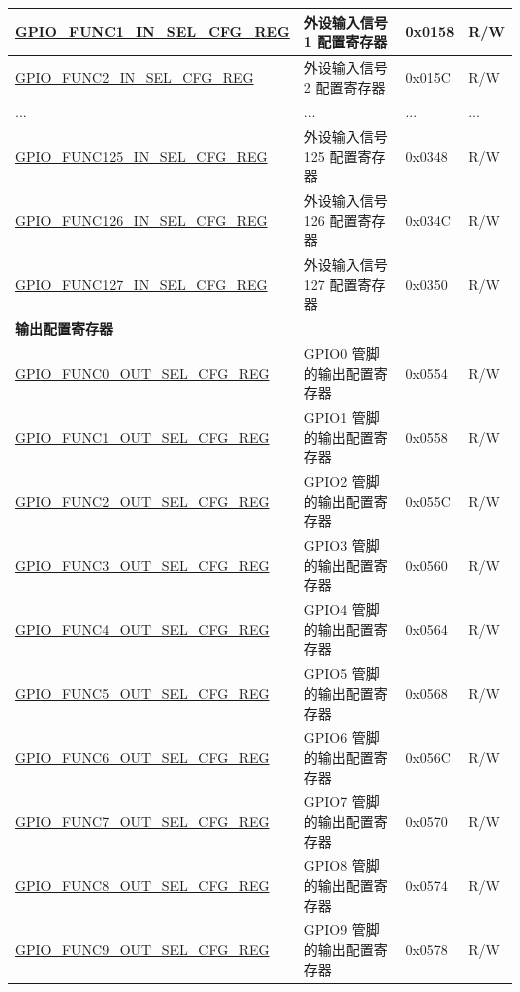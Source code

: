 \begin{longtable}{ | p{6cm} | p{6.7cm} | p{1.3cm} | p{1.5cm} | }
\hyperref[regdesc:GPIOFUNCNINSELCFGREG]{GPIO\_FUNC1\_IN\_SEL\_CFG\_REG} & 外设输入信号 1 配置寄存器 & 0x0158 & R/W \\ \hline
\hyperref[regdesc:GPIOFUNCNINSELCFGREG]{GPIO\_FUNC2\_IN\_SEL\_CFG\_REG} & 外设输入信号 2 配置寄存器 & 0x015C & R/W \\ \hline
... & ... & ... & ... \\ \hline
\hyperref[regdesc:GPIOFUNCNINSELCFGREG]{GPIO\_FUNC125\_IN\_SEL\_CFG\_REG} & 外设输入信号 125 配置寄存器 & 0x0348 & R/W \\ \hline
\hyperref[regdesc:GPIOFUNCNINSELCFGREG]{GPIO\_FUNC126\_IN\_SEL\_CFG\_REG} & 外设输入信号 126 配置寄存器 & 0x034C & R/W \\ \hline
\hyperref[regdesc:GPIOFUNCNINSELCFGREG]{GPIO\_FUNC127\_IN\_SEL\_CFG\_REG} & 外设输入信号 127 配置寄存器 & 0x0350 & R/W \\ \hline
\multicolumn{4}{|l|}{\textbf{输出配置寄存器}} \\ \hline
\hyperref[regdesc:GPIOFUNCNOUTSELCFGREG]{GPIO\_FUNC0\_OUT\_SEL\_CFG\_REG} & GPIO0 管脚的输出配置寄存器 & 0x0554 & R/W \\ \hline
\hyperref[regdesc:GPIOFUNCNOUTSELCFGREG]{GPIO\_FUNC1\_OUT\_SEL\_CFG\_REG} & GPIO1 管脚的输出配置寄存器 & 0x0558 & R/W \\ \hline
\hyperref[regdesc:GPIOFUNCNOUTSELCFGREG]{GPIO\_FUNC2\_OUT\_SEL\_CFG\_REG} & GPIO2 管脚的输出配置寄存器 & 0x055C & R/W \\ \hline
\hyperref[regdesc:GPIOFUNCNOUTSELCFGREG]{GPIO\_FUNC3\_OUT\_SEL\_CFG\_REG} & GPIO3 管脚的输出配置寄存器 & 0x0560 & R/W \\ \hline
\hyperref[regdesc:GPIOFUNCNOUTSELCFGREG]{GPIO\_FUNC4\_OUT\_SEL\_CFG\_REG} & GPIO4 管脚的输出配置寄存器 & 0x0564 & R/W \\ \hline
\hyperref[regdesc:GPIOFUNCNOUTSELCFGREG]{GPIO\_FUNC5\_OUT\_SEL\_CFG\_REG} & GPIO5 管脚的输出配置寄存器 & 0x0568 & R/W \\ \hline
\hyperref[regdesc:GPIOFUNCNOUTSELCFGREG]{GPIO\_FUNC6\_OUT\_SEL\_CFG\_REG} & GPIO6 管脚的输出配置寄存器 & 0x056C & R/W \\ \hline
\hyperref[regdesc:GPIOFUNCNOUTSELCFGREG]{GPIO\_FUNC7\_OUT\_SEL\_CFG\_REG} & GPIO7 管脚的输出配置寄存器 & 0x0570 & R/W \\ \hline
\hyperref[regdesc:GPIOFUNCNOUTSELCFGREG]{GPIO\_FUNC8\_OUT\_SEL\_CFG\_REG} & GPIO8 管脚的输出配置寄存器 & 0x0574 & R/W \\ \hline
\hyperref[regdesc:GPIOFUNCNOUTSELCFGREG]{GPIO\_FUNC9\_OUT\_SEL\_CFG\_REG} & GPIO9 管脚的输出配置寄存器 & 0x0578 & R/W \\ \hline

\end{longtable}
